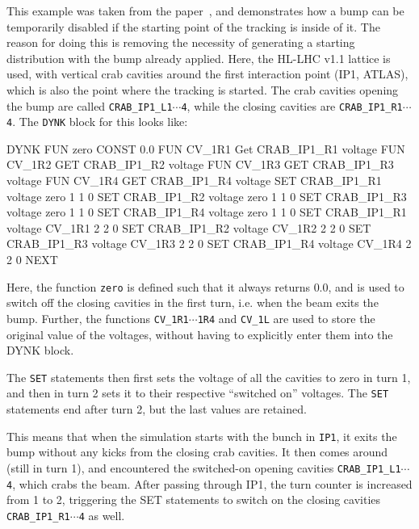 This example was taken from the paper~\cite{DYNKpaper}, and demonstrates how a bump can be temporarily disabled if the starting point of the tracking is inside of it.
The reason for doing this is removing the necessity of generating a starting distribution with the bump already applied.
Here, the HL-LHC v1.1 lattice is used, with vertical crab cavities around the first interaction point (IP1, ATLAS), which is also the point where the tracking is started.
The crab cavities opening the bump are called \texttt{CRAB\_IP1\_L1$\cdots$4}, while the closing cavities are \texttt{CRAB\_IP1\_R1$\cdots$4}.
The \texttt{DYNK} block for this looks like:
\begin{cverbatim}
DYNK
FUN zero CONST 0.0
FUN CV_1R1 Get CRAB_IP1_R1 voltage
FUN CV_1R2 GET CRAB_IP1_R2 voltage
FUN CV_1R3 GET CRAB_IP1_R3 voltage
FUN CV_1R4 GET CRAB_IP1_R4 voltage
SET CRAB_IP1_R1 voltage zero 1 1 0
SET CRAB_IP1_R2 voltage zero 1 1 0
SET CRAB_IP1_R3 voltage zero 1 1 0
SET CRAB_IP1_R4 voltage zero 1 1 0
SET CRAB_IP1_R1 voltage CV_1R1 2 2 0
SET CRAB_IP1_R2 voltage CV_1R2 2 2 0
SET CRAB_IP1_R3 voltage CV_1R3 2 2 0
SET CRAB_IP1_R4 voltage CV_1R4 2 2 0
NEXT
\end{cverbatim}

Here, the function \texttt{zero} is defined such that it always returns $0.0$, and is used to switch off the closing cavities in the first turn, i.e. when the beam exits the bump.
Further, the functions \texttt{CV\_1R1$\cdots$1R4} and \texttt{CV\_1L} are used to store the original value of the voltages, without having to explicitly enter them into the DYNK block.

The \texttt{SET} statements then first sets the voltage of all the cavities to zero in turn 1, and then in turn 2 sets it to their respective ``switched on'' voltages.
The \texttt{SET} statements end after turn 2, but the last values are retained.

This means that when the simulation starts with the bunch in \texttt{IP1}, it exits the bump without any kicks from the closing crab cavities.
It then comes around (still in turn 1), and encountered the switched-on opening cavities \texttt{CRAB\_IP1\_L1$\cdots$4}, which crabs the beam.
After passing through IP1, the turn counter is increased from 1 to 2, triggering the SET statements to switch on the closing cavities \texttt{CRAB\_IP1\_R1$\cdots$4} as well.

